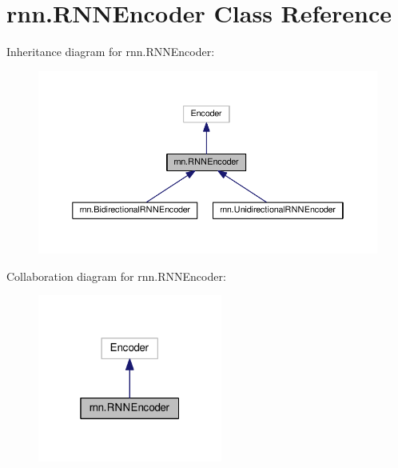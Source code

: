 \hypertarget{classrnn_1_1RNNEncoder}{}\section{rnn.\+R\+N\+N\+Encoder Class Reference}
\label{classrnn_1_1RNNEncoder}


Inheritance diagram for rnn.\+R\+N\+N\+Encoder\+:
\nopagebreak
\begin{figure}[H]
\begin{center}
\leavevmode
\includegraphics[width=350pt]{classrnn_1_1RNNEncoder__inherit__graph}
\end{center}
\end{figure}


Collaboration diagram for rnn.\+R\+N\+N\+Encoder\+:
\nopagebreak
\begin{figure}[H]
\begin{center}
\leavevmode
\includegraphics[width=172pt]{classrnn_1_1RNNEncoder__coll__graph}
\end{center}
\end{figure}
